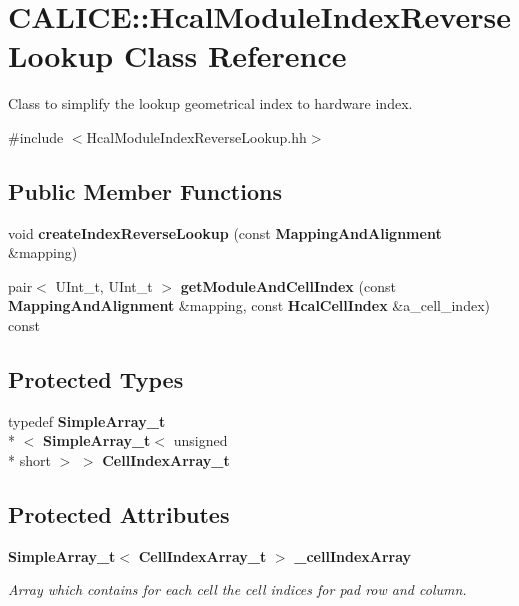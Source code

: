 \section{C\-A\-L\-I\-C\-E\-:\-:Hcal\-Module\-Index\-Reverse\-Lookup Class Reference}
\label{classCALICE_1_1HcalModuleIndexReverseLookup}


Class to simplify the lookup geometrical index to hardware index.  




{\ttfamily \#include $<$Hcal\-Module\-Index\-Reverse\-Lookup.\-hh$>$}

\subsection*{Public Member Functions}
\begin{DoxyCompactItemize}
\item 
void {\bfseries create\-Index\-Reverse\-Lookup} (const {\bf Mapping\-And\-Alignment} \&mapping)\label{classCALICE_1_1HcalModuleIndexReverseLookup_a03bfcfc65304f8f75efd7108c39cd7ee}

\item 
pair$<$ U\-Int\-\_\-t, U\-Int\-\_\-t $>$ {\bfseries get\-Module\-And\-Cell\-Index} (const {\bf Mapping\-And\-Alignment} \&mapping, const {\bf Hcal\-Cell\-Index} \&a\-\_\-cell\-\_\-index) const \label{classCALICE_1_1HcalModuleIndexReverseLookup_a1e5edb46e871ee9ac4b260385de6282d}

\end{DoxyCompactItemize}
\subsection*{Protected Types}
\begin{DoxyCompactItemize}
\item 
typedef {\bf Simple\-Array\-\_\-t}\\*
$<$ {\bf Simple\-Array\-\_\-t}$<$ unsigned \\*
short $>$ $>$ {\bfseries Cell\-Index\-Array\-\_\-t}\label{classCALICE_1_1HcalModuleIndexReverseLookup_acfe7ef8150b7fc889aee587be5a9ff95}

\end{DoxyCompactItemize}
\subsection*{Protected Attributes}
\begin{DoxyCompactItemize}
\item 
{\bf Simple\-Array\-\_\-t}$<$ {\bf Cell\-Index\-Array\-\_\-t} $>$ {\bf \-\_\-cell\-Index\-Array}
\begin{DoxyCompactList}\small\item\em Array which contains for each cell the cell indices for pad row and column. \end{DoxyCompactList}\end{DoxyCompactItemize}


